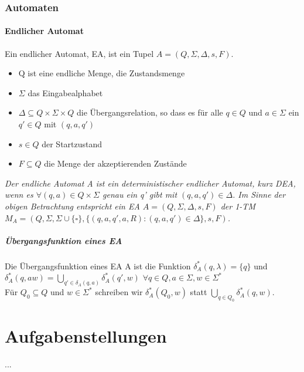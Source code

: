 \documentclass[DIV=15]{scrartcl}
\begin{document}
\section{Automaten}
    \subsection{Endlicher Automat}
        Ein endlicher Automat, EA, ist ein Tupel \(A=(Q,\Sigma,\Delta,s,F)\).
        \begin{itemize}
            \item Q ist eine endliche Menge, die Zustandsmenge 
            \item \(\Sigma\) das Eingabealphabet
            \item \(\Delta\subseteq Q\times\Sigma\times Q \) die Übergangsrelation, so dass es 
            für alle \(q\in Q\) und \(a\in\Sigma\) ein \(q'\in Q\) mit \((q,a,q')\)
            \item \(s\in Q\) der Startzustand 
            \item \(F\subseteq Q\) die Menge der akzeptierenden Zustände
        \end{itemize}
        \textit{Der endliche Automat A ist ein deterministischer endlicher Automat, kurz DEA, wenn es
        \(\forall(q,a)\in Q\times\Sigma\) genau ein q' gibt mit \((q,a,q')\in\Delta\).
        Im Sinne der obigen Betrachtung entspricht ein EA \(A=(Q,\Sigma,\Delta,s,F)\) der 1-TM
        \(M_A=(Q,\Sigma,\Sigma\cup\{\square\},\{(q,a,q',a,R):(q,a,q')\in\Delta\},s,F)\).} 
        \subsubsection{Übergangsfunktion eines EA}
            Die Übergangsfunktion eines EA A ist die Funktion \(\delta _A^*(q,\lambda)=\{q\}\) und 
            \(\delta_A^*(q,aw)=\bigcup\limits_{q'\in\delta_A(q,a)}\delta_A^*(q',w)\) 
            \(\forall q\in Q,a\in\Sigma, w\in\Sigma^*\)\\
            Für \(Q_0\subseteq Q\) und \(w\in\Sigma^*\) schreiben wir \(\delta_A^*(Q_0,w)\) statt 
            \(\bigcup\limits_{q\in Q_0}\delta_A^*(q,w)\).
\newpage
\part{Aufgabenstellungen}
...
\end{document}
